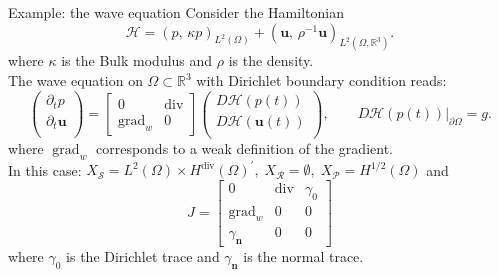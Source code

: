 \documentclass[aspectratio=169]{beamer}
\DeclareMathOperator*{\grad}{grad}
\renewcommand{\div}{\operatorname{div}}
\newcommand{\bbR}{\mathbb{R}}
\newcommand{\inpr}[3][]{\ensuremath{( #2, \, #3 )_{#1}}}
\begin{document}
\begin{frame}{Example: the wave equation}
	Consider the Hamiltonian
	\begin{equation*}
		\mathcal{H} = \inpr[L^2(\Omega)]{p}{\kappa p} + \inpr[L^2(\Omega, \bbR^3)]{\bm{u}}{\rho^{-1}\bm{u}}.
	\end{equation*}
	where $\kappa$ is the Bulk modulus and $\rho$ is the density. \\
	\vspace{.5cm}
	The wave equation on $\Omega \subset \bbR^3$ with Dirichlet boundary condition reads:
	\begin{equation*}
			\begin{pmatrix}
			\partial_t p \\
			\partial_{t} \bm{u} \\
		\end{pmatrix} =
		\begin{bmatrix}
			0 & \div \\
			\grad_w & 0
		\end{bmatrix}
		\begin{pmatrix}
			D\mathcal{H}(p(t)) \\
			D\mathcal{H}(\bm{u}(t)) \\
		\end{pmatrix}, \qquad D\mathcal{H}(p(t))|_{\partial\Omega} = g. 
	\end{equation*}
where $\grad_w$ corresponds to a weak definition of the gradient.\\
In this case: $X_{\mathcal{S}}= L^2(\Omega) \times H^{\div}(\Omega)^{'}, \; X_{\mathcal{R}} = \emptyset, \; X_{\mathcal{P}}= H^{1/2}(\Omega)$ and
\begin{equation*}
		J = \begin{bmatrix}
			0 & \div & \gamma_0 \\
			\grad_w & 0 & 0 \\
			\gamma_{\bm{n}} & 0 & 0 
		\end{bmatrix}
	\end{equation*}
where $\gamma_0$ is the Dirichlet trace  and $\gamma_{\bm{n}}$ is the normal trace.

\end{frame}
\end{document}
